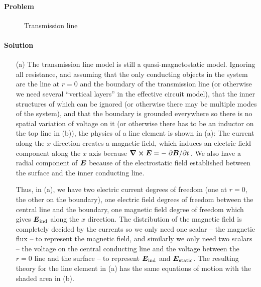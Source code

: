 \documentclass[hyperref, a4paper]{article}
\begin{document}
\paragraph{Problem} 

\begin{figure}
    \centering
    
    \caption{Transmission line}
    \label{fig:transmission}
\end{figure}

\paragraph{Solution} 
\begin{itemize}
\item[(a)] The transmission line model is still a quasi-magnetostatic model.
Ignoring all resistance, and assuming that 
the only conducting objects in the system 
are the line at $r = 0$ and the boundary of the transmission line
(or otherwise we need several ``vertical layers'' in the effective circuit model),
that the inner structures of which can be ignored
(or otherwise there may be multiple modes of the system),
and that the boundary is grounded everywhere so there is no spatial variation of voltage on it
(or otherwise there has to be an inductor on the top line in (b)),
the physics of a line element is shown in (a):
The current along the $x$ direction creates a magnetic field, 
which induces an electric field component along the $x$ axis 
because $\curl{\vb*{E}} = - \pdv*{\vb*{B}}{t}$.
We also have a radial component of $\vb*{E}$ 
because of the electrostatic field established between the surface and the inner conducting line.

Thus, in (a),
we have two electric current degrees of freedom (one at $r=0$, the other on the boundary),
one electric field degrees of freedom between the central line and the boundary,
one magnetic field degree of freedom 
which gives $\vb*{E}_{\text{ind}}$ along the $x$ direction.
The distribution of the magnetic field is completely decided by the currents 
so we only need one scalar -- the magnetic flux -- to represent the magnetic field,
and similarly we only need two scalars -- the voltage on the central conducting line 
and the voltage between the $r=0$ line and the surface -- 
to represent $\vb*{E}_{\text{ind}}$ and $\vb*{E}_{\text{static}}$.
The resulting theory for the line element in (a) 
has the same equations of motion with the shaded area in (b).


\end{itemize}
\end{document}
